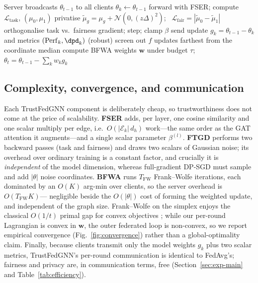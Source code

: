\begin{algorithm}[t]
\caption{TrustFedGNN (one communication round $t$)}
\label{alg:fedfairgnn}
\begin{algorithmic}[1]
\State Server broadcasts $\theta_{t-1}$ to all clients
  \State $\theta_k\gets\theta_{t-1}$
    \State forward with FSER; compute $\mathcal{L}_{\text{task}}$, $(\mu_0,\mu_1)$
    \State privatise $\tilde{\mu}_g=\mu_g+\mathcal{N}(0,(z\Delta)^2)$; \ $\mathcal{L}_{\text{fair}}=|\tilde{\mu}_0-\tilde{\mu}_1|$
    \State orthogonalise task vs.\ fairness gradient; step; clamp $\beta$
  \EndFor
  \State send update $g_k=\theta_{t-1}-\theta_k$ and metrics $(\mathrm{Perf}_k,\dpd_k)$
\EndFor
\State (robust) screen out $f$ updates farthest from the coordinate median
\State compute BFWA weights $\mathbf{w}$ under budget $\tau$; \ $\theta_t=\theta_{t-1}-\sum_k w_k g_k$
\end{algorithmic}
\end{algorithm}

\subsection{Complexity, convergence, and communication}
\label{sec:complexity}
Each TrustFedGNN component is deliberately cheap, so trustworthiness does not come
at the price of scalability. \textbf{FSER} adds, per layer, one cosine similarity
and one scalar multiply per edge, i.e.\ $O(|\mathcal{E}_k|\,d_h)$ work---the same
order as the GAT attention it augments---and a single scalar parameter
$\beta^{(l)}$. \textbf{FTGD} performs two backward passes (task and fairness) and
draws two scalars of Gaussian noise; its overhead over ordinary training is a
constant factor, and crucially it is \emph{independent} of the model dimension,
whereas full-gradient DP-SGD must sample and add $|\theta|$ noise coordinates.
\textbf{BFWA} runs $T_{\mathrm{FW}}$ Frank--Wolfe iterations, each dominated by an
$O(K)$ arg-min over clients, so the server overhead is $O(T_{\mathrm{FW}}K)$---
negligible beside the $O(|\theta|)$ cost of forming the weighted update, and
independent of the graph size. Frank--Wolfe on the simplex enjoys the classical
$O(1/t)$ primal gap for convex objectives \cite{jaggi2013revisiting}; while our
per-round Lagrangian is convex in $\mathbf{w}$, the outer federated loop is
non-convex, so we report empirical convergence (Fig.~\ref{fig:convergence})
rather than a global-optimality claim. Finally, because clients transmit only
the model weights $g_k$ plus two scalar metrics, TrustFedGNN's per-round
communication is identical to FedAvg's; fairness and privacy are, in
communication terms, free (Section~\ref{sec:exp-main} and
Table~\ref{tab:efficiency}).

